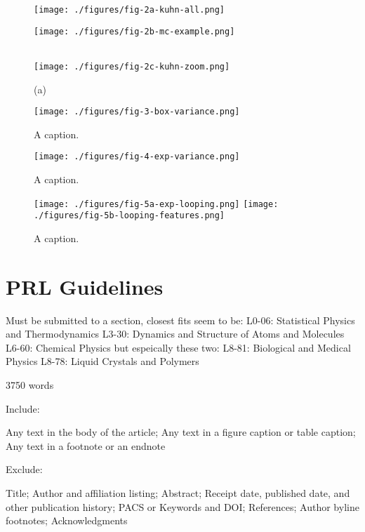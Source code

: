 \documentclass[%
 reprint,
superscriptaddress,
showpacs,preprintnumbers,
 amsmath,amssymb,
 aps,
 prl,
]{revtex4-1}
\begin{document}
\begin{figure}[t]
    \centering
    \begin{minipage}{0.65\linewidth}
        \texttt{[image: ./figures/fig-2a-kuhn-all.png]}
    \end{minipage}
    \begin{minipage}{0.30\linewidth}
        \vfill
        \texttt{[image: ./figures/fig-2b-mc-example.png]}
        \vfill
    \end{minipage}
    \\
    \texttt{[image: ./figures/fig-2c-kuhn-zoom.png]}
    \caption{(a) }
\end{figure}
\begin{figure}[t]
    \centering
    \texttt{[image: ./figures/fig-3-box-variance.png]}
    \caption{A caption.}
\end{figure}
\begin{figure}[t]
    \centering
    \texttt{[image: ./figures/fig-4-exp-variance.png]}
    \caption{A caption.}
\end{figure}
\begin{figure}[t]
    \centering
    \texttt{[image: ./figures/fig-5a-exp-looping.png]}
    \texttt{[image: ./figures/fig-5b-looping-features.png]}
    \caption{A caption.}
\end{figure}

\section{PRL Guidelines}

Must be submitted to a section, closest fits seem to be:
L0-06: Statistical Physics and Thermodynamics
L3-30: Dynamics and Structure of Atoms and Molecules
L6-60: Chemical Physics
but espeically these two:
L8-81: Biological and Medical Physics
L8-78: Liquid Crystals and Polymers


3750 words

Include:

Any text in the body of the article;
Any text in a figure caption or table caption;
Any text in a footnote or an endnote

Exclude:

Title;
Author and affiliation listing;
Abstract;
Receipt date, published date, and other publication history;
PACS or Keywords and DOI;\@
References;
Author byline footnotes;
Acknowledgments
\end{document}
